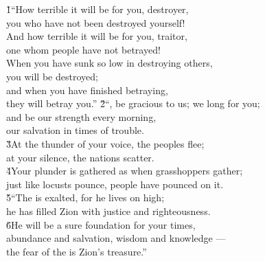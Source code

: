 \begin{poetry}
\poeml {}
\v{1}``How terrible it will be for you, destroyer, \\
\poemll    you who have not been destroyed yourself! \\
\poeml And how terrible it will be for you, traitor, \\
\poemll    one whom people have not betrayed! \\
\poeml When you have sunk so low in destroying others, \\
\poemll    you will be destroyed; \\
\poeml and when you have finished betraying, \\
\poemll    they will betray you.''
\poeml \v{2}``, be gracious to us; we long for you; \\
\poemll    and be our strength every morning, \\
\poemlll       our salvation in times of trouble. \\
\poeml \v{3}At the thunder of your voice, the peoples flee; \\
\poemll    at your silence, the nations scatter. \\
\poeml \v{4}Your plunder is gathered as when grasshoppers gather; \\
\poemll    just like locusts pounce, people have pounced on it. \\
\poeml \v{5}``The  is exalted, for he lives on high; \\
\poemll    he has filled Zion with justice and righteousness. \\
\poeml \v{6}He will be a sure foundation for your times, \\
\poemll    abundance and salvation, wisdom and knowledge --- \\
\poemlll       the fear of the  is Zion's treasure.''

\end{poetry}
